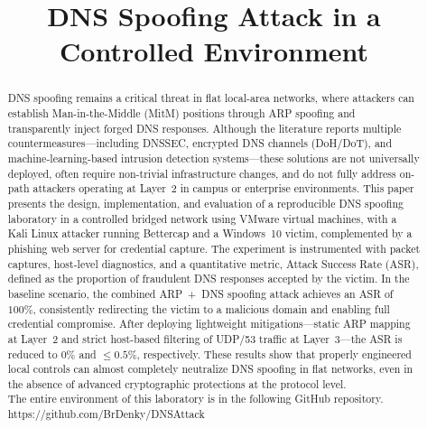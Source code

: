 \documentclass[conference]{IEEEtran}
\begin{document}
\title{DNS Spoofing Attack in a Controlled Environment}

\author{
}


\maketitle

\begin{abstract}
DNS spoofing remains a critical threat in flat local-area networks, where attackers can establish Man-in-the-Middle (MitM) positions through ARP spoofing and transparently inject forged DNS responses. Although the literature reports multiple countermeasures---including DNSSEC, encrypted DNS channels (DoH/DoT), and machine-learning-based intrusion detection systems—these solutions are not universally deployed, often require non-trivial infrastructure changes, and do not fully address on-path attackers operating at Layer~2 in campus or enterprise environments. This paper presents the design, implementation, and evaluation of a reproducible DNS spoofing laboratory in a controlled bridged network using VMware virtual machines, with a Kali Linux attacker running Bettercap and a Windows~10 victim, complemented by a phishing web server for credential capture. The experiment is instrumented with packet captures, host-level diagnostics, and a quantitative metric, Attack Success Rate (ASR), defined as the proportion of fraudulent DNS responses accepted by the victim. In the baseline scenario, the combined ARP~+~DNS spoofing attack achieves an ASR of $100\%$, consistently redirecting the victim to a malicious domain and enabling full credential compromise. After deploying lightweight mitigations—static ARP mapping at Layer~2 and strict host-based filtering of UDP/53 traffic at Layer~3—the ASR is reduced to $0\%$ and $\leq 0.5\%$, respectively. These results show that properly engineered local controls can almost completely neutralize DNS spoofing in flat networks, even in the absence of advanced cryptographic protections at the protocol level. \\
The entire environment of this laboratory is in the following GitHub repository.\\
https://github.com/BrDenky/DNSAttack
\end{abstract}
\end{document}
